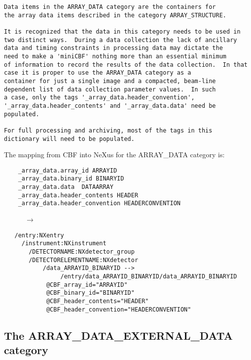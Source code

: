 \documentclass[11pt]{article}
\begin{document}
{\footnotesize\begin{verbatim}
Data items in the ARRAY_DATA category are the containers for
the array data items described in the category ARRAY_STRUCTURE.
    
It is recognized that the data in this category needs to be used in
two distinct ways.  During a data collection the lack of ancillary
data and timing constraints in processing data may dictate the
need to make a 'miniCBF' nothing more than an essential minimum
of information to record the results of the data collection.  In that
case it is proper to use the ARRAY_DATA category as a
container for just a single image and a compacted, beam-line
dependent list of data collection parameter values.  In such
a case, only the tags '_array_data.header_convention',
'_array_data.header_contents' and '_array_data.data' need be
populated.
    
For full processing and archiving, most of the tags in this
dictionary will need to be populated.
\end{verbatim}

The mapping from CBF into NeXus for the ARRAY\_DATA category is:

\begin{verbatim}     
    _array_data.array_id ARRAYID
    _array_data.binary_id BINARYID
    _array_data.data  DATAARRAY
    _array_data.header_contents HEADER
    _array_data.header_convention HEADERCONVENTION
\end{verbatim}
~~~~~~$\rightarrow$\\
\begin{verbatim}
   /entry:NXentry
     /instrument:NXinstrument
       /DETECTORNAME:NXdetector_group
       /DETECTORELEMENTNAME:NXdetector
           /data_ARRAYID_BINARYID -->
                /entry/data_ARRAYID_BINARYID/data_ARRAYID_BINARYID
            @CBF_array_id="ARRAYID"
            @CBF_binary_id="BINARYID"
            @CBF_header_contents="HEADER"
            @CBF_header_convention="HEADERCONVENTION"
\end{verbatim}
}

\subsection{The ARRAY\_DATA\_EXTERNAL\_DATA category}
\end{document}
